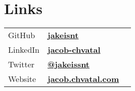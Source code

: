 \documentclass[letterpaper]{cv} %
\begin{document}
\begin{minipage}[t]{0.33\textwidth}
  \section{Links}
  \begin{tabular}[t]{lll}
  GitHub &\href{https://github.com/jakeisnt}{\bf jakeisnt} \\
  LinkedIn &\href{https://www.linkedin.com/in/jacob-chvatal}{\bf jacob-chvatal} \\
  Twitter &\href{https://twitter.com/jakeissnt}{\bf @jakeissnt} \\
  Website &\href{https://jacob.chvatal.com}{\bf jacob.chvatal.com} \\
  \end{tabular}
  \sectionspace


\end{minipage} %
\hfill
%
%
\end{document}
